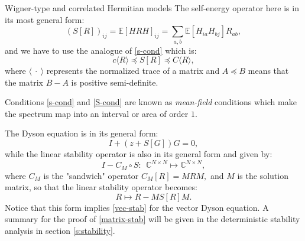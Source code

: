 \documentclass[11pt, a4paper, oneside]{book}
\numberwithin{equation}{chapter}
\newcommand{\E}{\mathbb E}
\newcommand{\beq}{\begin{equation}}
\newcommand{\eeq}{\end{equation}}
\begin{document}
\begin{section}{Wigner-type and correlated Hermitian models}
The self-energy operator here is in its most general form:
\[
(S[R])_{ij} = \E[H R H]_{ij} = \sum \limits_{a,b} \E[H_{ia}H_{bj}] R_{ab} ,
\]
%
and we have to use the analogue of \eqref{s-cond} which is:
%
\beq \label{S-cond}
c \langle R \rangle \preceq S[R] \preceq C \langle R \rangle,
\eeq
where $\langle \ \cdot \ \rangle$ represents the normalized trace of a matrix and $A \preceq B$ means that the matrix $B-A$ is positive semi-definite.

Conditions \eqref{s-cond} and \eqref{S-cond} are known as \textit{mean-field} conditions which make the spectrum map into an interval or area of order $1$.

The Dyson equation is in its general form:
\[
I +(z+S[G])G = 0,
\]
%
while the linear stability operator is also in its general form and given by:
\beq \label{super-oper1}
I - C_{M} \circ S  : \ \ \mathbb{C}^{N \times N} \mapsto \mathbb{C}^{N \times N},
\eeq
where $C_M$ is the "sandwich" operator $C_M[R]= MRM,$ and $M$ is the solution matrix, so that the linear stability operator becomes:
\beq \label{matrix-stab}
R \mapsto R - M S[R] M .
\eeq
%
Notice that this form implies \eqref{vec-stab} for the vector Dyson equation. A summary for the proof of \eqref{matrix-stab} will be given in the deterministic stability analysis in section \ref{s:stability}.
\end{section}
\end{document}
